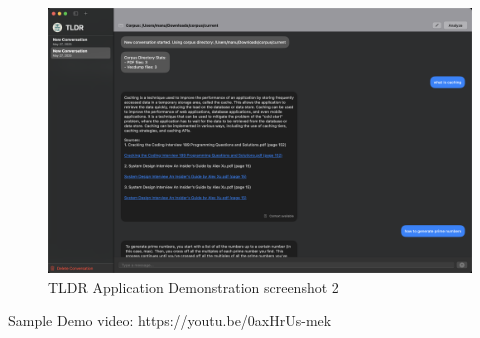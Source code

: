 \begin{figure}[h]
    \centering
    \includegraphics[width=1.0\linewidth]{images/result2.png}
    \caption{TLDR Application Demonstration screenshot 2}
    \label{fig:tldrAppDemoSc2}
\end{figure}

Sample Demo video: https://youtu.be/0axHrUs-mek